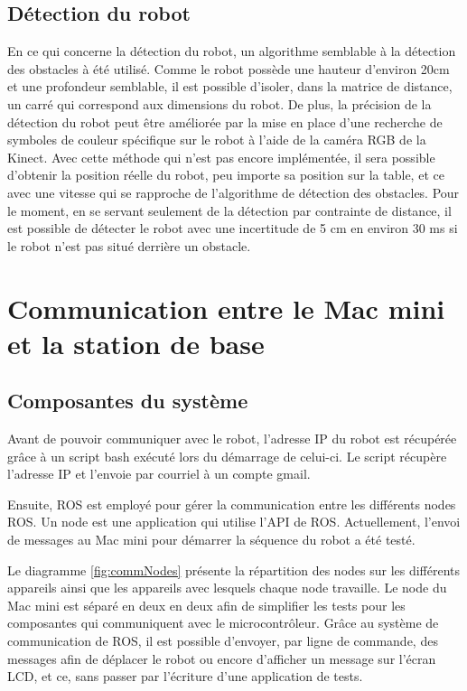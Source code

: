 \subsection{Détection du robot}
En ce qui concerne la détection du robot, un algorithme semblable à la détection des obstacles à été utilisé. Comme le robot possède une hauteur d'environ 20cm et une profondeur semblable, il est possible d'isoler, dans la matrice de distance, un carré qui correspond aux dimensions du robot. De plus, la précision de la détection du robot peut être améliorée par la mise en place d'une recherche de symboles de couleur spécifique sur le robot à l'aide de la caméra RGB de la Kinect. Avec cette méthode qui n'est pas encore implémentée, il sera possible d'obtenir la position réelle du robot, peu importe sa position sur la table, et ce avec une vitesse qui se rapproche de l'algorithme de détection des obstacles. Pour le moment, en se servant seulement de la détection par contrainte de distance, il est possible de détecter le robot avec une incertitude de 5 cm en environ 30 ms si le robot n'est pas situé derrière un obstacle.

\section{Communication entre le Mac mini et la station de base}
\subsection{Composantes du système}
Avant de pouvoir communiquer avec le robot, l’adresse IP du robot est récupérée grâce à un script bash exécuté lors du démarrage de celui-ci. Le script récupère l’adresse IP et l’envoie par courriel à un compte gmail.

Ensuite, ROS est employé pour gérer la communication entre les différents nodes ROS. Un node est une application qui utilise l’API de ROS. Actuellement, l’envoi de messages au Mac mini pour démarrer la séquence du robot a été testé.

Le diagramme \ref{fig:commNodes} présente la répartition des nodes sur les différents appareils ainsi que les appareils avec lesquels chaque node travaille. Le node du Mac mini est séparé en deux en deux afin de simplifier les tests pour les composantes qui communiquent avec le microcontrôleur. Grâce au système de communication de ROS, il est possible d'envoyer, par ligne de commande, des messages afin de déplacer le robot ou encore d'afficher un message sur l’écran LCD, et ce, sans passer par l’écriture d’une application de tests.


